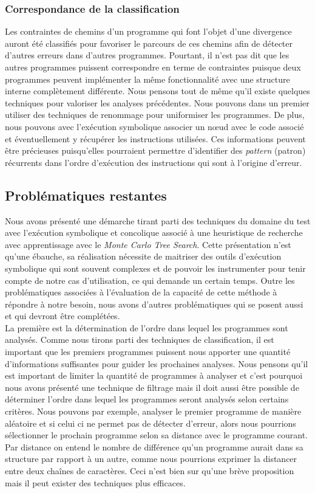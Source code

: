 \subsubsection*{Correspondance de la classification}
Les contraintes de chemins d'un programme qui font l'objet d'une divergence auront été classifiés pour favoriser le parcours de ces chemins afin de détecter d'autres erreurs dans d'autres programmes.
Pourtant, il n'est pas dit que les autres programmes puissent correspondre en terme de contraintes puisque deux programmes peuvent implémenter la même fonctionnalité avec une structure interne complètement différente.
Nous pensons tout de même qu'il existe quelques techniques pour valoriser les analyses précédentes. Nous pouvons dans un premier utiliser des techniques de renommage pour uniformiser les programmes. De plus, nous pouvons avec l'exécution symbolique associer un nœud avec le code associé et éventuellement y récupérer les instructions utilisées. Ces informations peuvent être précieuses puisqu'elles pourraient permettre d'identifier des \textit{pattern} (patron) récurrents dans l'ordre d'exécution des instructions qui sont à l'origine d'erreur.

\subsection{Problématiques restantes}
Nous avons présenté une démarche tirant parti des techniques du domaine du test avec l'exécution symbolique et concolique associé à une heuristique de recherche avec apprentissage avec le \textit{Monte Carlo Tree Search}. Cette présentation n'est qu'une ébauche, sa réalisation nécessite de maitriser des outils d'exécution symbolique qui sont souvent complexes et de pouvoir les instrumenter pour tenir compte de notre cas d'utilisation, ce qui demande un certain temps. Outre les problématiques associées à l'évaluation de la capacité de cette méthode à répondre à notre besoin, nous avons d'autres problématiques qui se posent aussi et qui devront être complétées.\\

La première est la détermination de l'ordre dans lequel les programmes sont analysés. Comme nous tirons parti des techniques de classification, il est important que les premiers programmes puissent nous apporter une quantité d'informations suffisantes pour guider les prochaines analyses. Nous pensons qu'il est important de limiter la quantité de programmes à analyser et c'est pourquoi nous avons présenté une technique de filtrage mais il doit aussi être possible de déterminer l'ordre dans lequel les programmes seront analysés selon certains critères. Nous pouvons par exemple, analyser le premier programme de manière aléatoire et si celui ci ne permet pas de détecter d'erreur, alors nous pourrions sélectionner le prochain programme selon sa distance avec le programme courant. Par distance on entend le nombre de différence qu'un programme aurait dans sa structure par rapport à un autre, comme nous pourrions exprimer la distancer entre deux chaînes de caractères. Ceci n'est bien sur qu'une brève proposition mais il peut exister des techniques plus efficaces.\\

